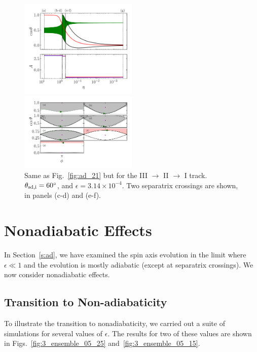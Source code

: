 \documentclass[
        fleqn,
        usenatbib,
    ]{mnras}
\begin{document}
\begin{figure}
    \centering
    \includegraphics[width=0.5\textwidth]{plots_diskdisp/3testo321.png}

    \includegraphics[width=0.5\textwidth]{plots_diskdisp/3testo321_subplots.png}
    \caption{Same as Fig.~\ref{fig:ad_21} but for the III $\to$ II $\to$ I
    track. $\theta_{\rm sd, i} = 60^\circ$, and $\epsilon = 3.14 \times
    10^{-4}$. Two separatrix crossings are shown, in panels (c-d) and
    (e-f).}\label{fig:ad_321}
\end{figure}

\section{Nonadiabatic Effects}\label{s:nonad}

In Section~\ref{s:ad}, we have examined the spin axis evolution in the limit
where $\epsilon \ll 1$ and the evolution is mostly adiabatic (except at
separatrix crossings). We now consider nonadiabatic effects.

\subsection{Transition to Non-adiabaticity}\label{ss:transition}

To illustrate the transition to nonadiabaticity, we carried out a suite of
simulations for several values of $\epsilon$. The results for two of these
values are shown in Figs.~\ref{fig:3_ensemble_05_25}
and~\ref{fig:3_ensemble_05_15}.
\end{document}
